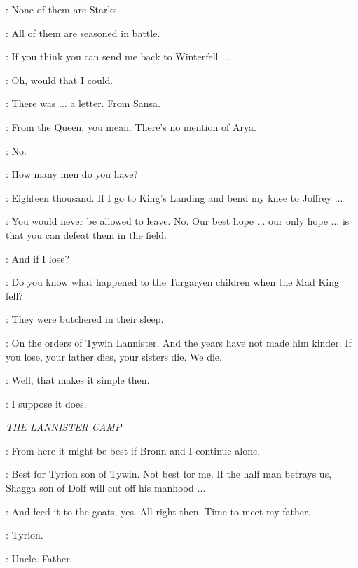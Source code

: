 \ROBB: None of them are Starks. 

\CATELYN: All of them are seasoned in battle. 

\ROBB: If you think you can send me back to Winterfell $\ldots$  

\CATELYN: Oh, would that I could. 

\ROBB: There was $\ldots$ a letter. From Sansa. 

\CATELYN: From the Queen, you mean.  There's no mention of Arya. 

\ROBB: No. 

\CATELYN: How many men do you have? 

\ROBB: Eighteen thousand. If I go to King's Landing and bend my knee to Joffrey $\ldots$  

\CATELYN: You would never be allowed to leave. No. Our best hope $\ldots$ our only hope $\ldots$ is that you can defeat them in the field. 

\ROBB: And if I lose? 

\CATELYN: Do you know what happened to the Targaryen children when the Mad King fell?

\ROBB: They were butchered in their sleep.

\CATELYN: On the orders of Tywin Lannister. And the years have not made him kinder. If you lose, your father dies, your sisters die. We die. 

\ROBB: Well, that makes it simple then. 

\CATELYN: I suppose it does. 


\scene

\textit{THE LANNISTER CAMP} 


\TYRION: From here it might be best if Bronn and I continue alone. 

\SHAGGA: Best for Tyrion son of Tywin. Not best for me. If the half man betrays us, Shagga son of Dolf will cut off his manhood $\ldots$  

\TYRION: And feed it to the goats, yes. All right then. Time to meet my father. 


\KEVAN: Tyrion. 

\TYRION: Uncle. Father. 

